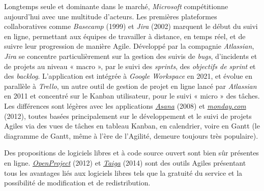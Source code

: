 \documentclass[
  letterpaper,
  DIV=11,
  numbers=noendperiod,
  oneside]{scrreprt}
\begin{document}
Longtemps seule et dominante dans le marché, \emph{Microsoft}
compétitionne aujourd'hui avec une multitude d'acteurs. Les premières
plateformes collaboratives comme \emph{Basecamp} (1999) et \emph{Jira}
(2002) marquent le début du suivi en ligne, permettant aux équipes de
travailler à distance, en temps réel, et de suivre leur progression de
manière Agile. Développé par la compagnie \emph{Atlassian}, \emph{Jira}
se concentre particulièrement sur la gestion des suivis de \emph{bugs},
d'incidents et de projets au niveau « macro », par le suivi des
\emph{sprints}, des \emph{objectifs de sprint} et des \emph{backlog}.
L'application est intégrée à \emph{Google Workspace} en 2021, et évolue
en parallèle à \emph{Trello}, un autre outil de gestion de projet en
ligne lancé par \emph{Atlassian} en 2011 et concentré sur le Kanban
utilisateur, pour le suivi « micro » des tâches. Les différences sont
légères avec les applications \href{https://asana.com/}{\emph{Asana}}
(2008) et \href{monday.com}{\emph{monday.com}} (2012), toutes basées
principalement sur le développement et le suivi de projets Agiles via
des vues de tâches en tableau Kanban, en calendrier, voire en Gantt (le
diagramme de Gantt, même à l'ère de l'Agilité, demeure toujours très
populaire).

Des propositions de logiciels libres et à code source ouvert sont bien
sûr présentes en ligne.
\href{https://www.openproject.org/}{\emph{OpenProject}} (2012) et
\href{https://taiga.io/}{\emph{Taiga}} (2014) sont des outils Agiles
présentant tous les avantages liés aux logiciels libres tels que la
gratuité du service et la possibilité de modification et de
redistribution.

\newlength\holdLTleft\newlength\holdLTright\setlength\holdLTleft{\LTleft}\relax\setlength\holdLTright{\LTright}\relax\setlength{}

\setlength{}
\end{document}
